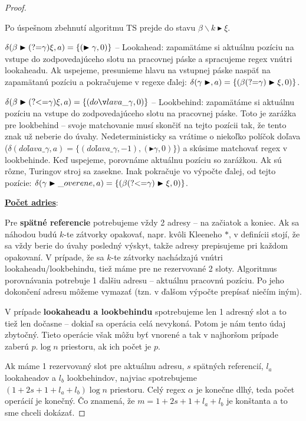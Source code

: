 \begin{proof}
\begin{list}{}{}
Po úspešnom zbehnutí algoritmu TS prejde do stavu $\beta\backslash k \blacktriangleright\xi$.
\item $\delta(\beta\blacktriangleright\text{(?=}\gamma)\xi, a) = \lbrace (\blacktriangleright\gamma, 0) \rbrace$ -- Lookahead: zapamätáme si aktuálnu pozíciu na vstupe do zodpovedajúceho slotu na pracovnej páske a spracujeme regex vnútri lookaheadu. Ak uspejeme, presunieme hlavu na vstupnej páske naspäť na zapamätanú pozíciu a pokračujeme v regexe ďalej: $\delta(\gamma\blacktriangleright, a) = \lbrace (\beta\text{(?=}\gamma)\blacktriangleright\xi, 0) \rbrace $.
\item $\delta(\beta\blacktriangleright\lookbehind\gamma)\xi, a) = \lbrace (doľava\_ \gamma, 0) \rbrace$
-- Lookbehind: zapamätáme si aktuálnu pozíciu na vstupe do zodpovedajúceho slotu na pracovnej páske. Toto je zarážka pre lookbehind -- svoje matchovanie musí skončiť na tejto pozícii tak, že tento znak už neberie do úvahy. Nedeterministicky sa vrátime o niekoľko políčok doľava ($\delta(doľava\_ \gamma, a) = \lbrace(doľava\_ \gamma,-1), (\blacktriangleright\gamma, 0)\rbrace$)  a skúsime matchovať regex v lookbehinde. Keď uspejeme, porovnáme aktuálnu pozíciu so zarážkou. Ak sú rôzne, Turingov stroj sa zasekne. Inak pokračuje vo výpočte ďalej, od tejto pozície: $\delta(\gamma\blacktriangleright\_overene, a) = \lbrace (\beta\text{(?\textless =} \gamma)\blacktriangleright\xi, 0) \rbrace $.
\end{list}

\textbf{\underline{Počet adries}}:

Pre \textbf{spätné referencie} potrebujeme vždy 2 adresy -- na začiatok a koniec. Ak sa náhodou budú $k$-te zátvorky opakovať, napr. kvôli Kleeneho $*$, v definícii stojí, že sa vždy berie do úvahy posledný výskyt, takže adresy prepisujeme pri každom opakovaní. V prípade, že sa $k$-te zátvorky nachádzajú vnútri lookaheadu/lookbehindu, tiež máme pre ne rezervované 2 sloty. Algoritmus porovnávania potrebuje 1 ďalšiu adresu -- aktuálnu pracovnú pozíciu. Po jeho dokončení adresu môžeme vymazať (tzn. v ďalšom výpočte prepísať niečím iným).

V prípade \textbf{lookaheadu a lookbehindu} spotrebujeme len 1 adresný slot a to tiež len dočasne -- dokiaľ sa operácia celá nevykoná. Potom je nám tento údaj zbytočný. Tieto operácie však môžu byť vnorené a tak v najhoršom prípade zaberú $p.\log n$ priestoru, ak ich počet je $p$.

Ak máme 1 rezervovaný slot pre aktuálnu adresu, $s$ spätných referencií, $l_a$ lookaheadov a $l_b$ lookbehindov, najviac spotrebujeme $(1+2s+1+l_a+l_b)\log n$ priestoru. Celý regex $\alpha$ je konečne dlhý, teda počet operácií je konečný. Čo znamená, že $m=1+2s+1+l_a+l_b$ je konštanta a to sme chceli dokázať.

\end{proof}


